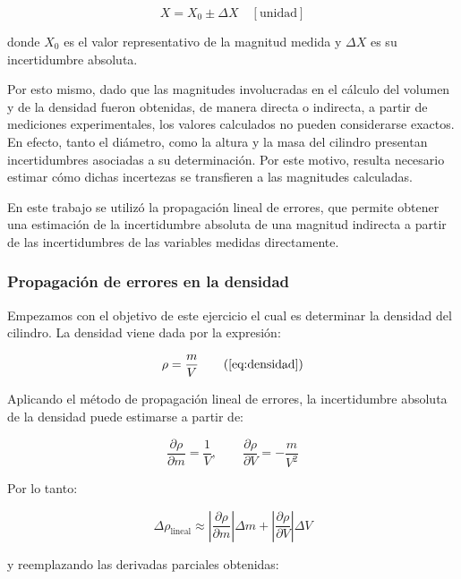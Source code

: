 \begin{equation}
X = X_0 \pm \Delta X \quad [\text{unidad}]
\end{equation}

donde $X_0$ es el valor representativo de la magnitud medida y $\Delta X$ es su incertidumbre absoluta.

Por esto mismo, dado que las magnitudes involucradas en el cálculo del volumen y de la densidad fueron obtenidas, de manera directa o indirecta, a partir de mediciones experimentales, los valores calculados no pueden considerarse exactos. En efecto, tanto el diámetro, como la altura y la masa del cilindro presentan incertidumbres asociadas a su determinación. Por este motivo, resulta necesario estimar cómo dichas incertezas se transfieren a las magnitudes calculadas.

En este trabajo se utilizó la propagación lineal de errores, que permite obtener una estimación de la incertidumbre absoluta de una magnitud indirecta a partir de las incertidumbres de las variables medidas directamente.

\subsubsection{Propagación de errores en la densidad}

Empezamos con el objetivo de este ejercicio el cual es determinar la densidad del cilindro.
La densidad viene dada por la expresión:

\begin{equation}
\rho = \frac{m}{V} \tag{\ref{eq:densidad}}
\end{equation}

Aplicando el método de propagación lineal de errores, la incertidumbre absoluta de la densidad puede estimarse a partir de:

\begin{equation}
\frac{\partial \rho}{\partial m} = \frac{1}{V},
\qquad
\frac{\partial \rho}{\partial V} = -\frac{m}{V^2}
\end{equation}

Por lo tanto:

\begin{equation}
\Delta \rho_{\text{lineal}} \approx
\left| \frac{\partial \rho}{\partial m} \right| \Delta m
+
\left| \frac{\partial \rho}{\partial V} \right| \Delta V
\end{equation}

y reemplazando las derivadas parciales obtenidas:


